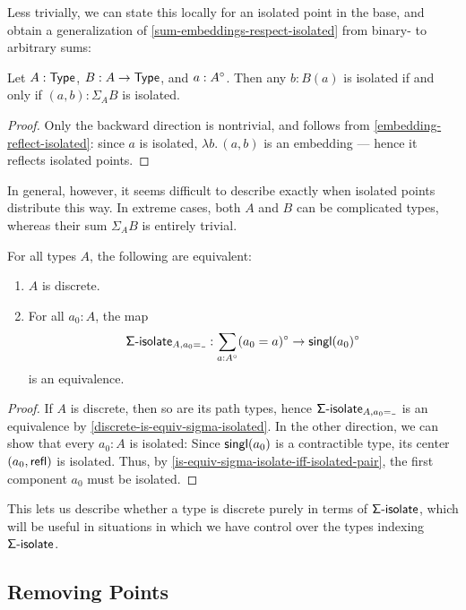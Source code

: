 Less trivially, we can state this locally for an isolated point in the base,
and obtain a generalization of \autoref{sum-embeddings-respect-isolated} from binary-
to arbitrary sums:
\begin{proposition}
  Let \( A : \operatorname{\mathsf{Type}} \), \( B : A \to \operatorname{\mathsf{Type}} \), and \( a : A^{\circ} \).
  Then any \( b : B(a) \) is isolated if and only if \( (a, b) : \Sigma_{A} B \) is isolated.
  \begin{proof}
    Only the backward direction is nontrivial,
    and follows from \autoref{embedding-reflect-isolated}:
    since \( a \) is isolated,
    \( \lambda b.\, (a, b) \) is an embedding
    ---
    hence it reflects isolated points.
  \end{proof}
\end{proposition}

In general, however, it seems difficult to describe exactly when isolated points distribute this way.
In extreme cases, both \( A \) and \( B \) can be complicated types, whereas their sum \( \Sigma_A B \) is entirely trivial.
\begin{proposition}\label{discrete-iff-is-equiv-singl-isolate}
  For all types \( A \), the following are equivalent:
  \begin{enumerate}
    \item \( A \) is discrete.
    \item For all \( a_0 : A \), the map
      \[
        \SigmaIsolate_{A, a_0 = {\Blank}} : \sum_{a : \Isolated{A}} \Isolated{(a_0 = a)} \to \Isolated{\Singl(a_0)}
      \]
      is an equivalence.
  \end{enumerate}
  \begin{proof}
    If \( A \) is discrete, then so are its path types, hence \( \SigmaIsolate_{A, a_0 = \Blank} \) is an equivalence by \autoref{discrete-is-equiv-sigma-isolated}.
    In the other direction, we can show that every \( a_0 : A \) is isolated:
    Since \( \operatorname{\mathsf{singl}}(a_0) \) is a contractible type, its center \( (a_0, \mathsf{refl}) \) is isolated.
    Thus, by \autoref{is-equiv-sigma-isolate-iff-isolated-pair}, the first component \( a_0 \) must be isolated.
  \end{proof}
\end{proposition}
This lets us describe whether a type is discrete purely in terms of \( \operatorname{\mathsf{\Sigma-isolate}} \),
which will be useful in situations in which we have control over the types indexing \( \operatorname{\mathsf{\Sigma-isolate}} \).

\subsection{Removing Points}\label{removing-points}


